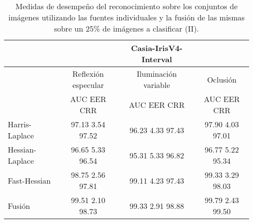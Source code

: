 \begin{table}[h]
\begin{center}
\begin{tabular}{@{}lccc@{}}
\toprule
&& Casia-IrisV4-Interval & \\ \hline
&Reflexión especular		&  	Iluminación variable		& Oclusión \\ \hline
&AUC  \phantom{aa} EER  \phantom{aa} CRR &  	AUC  \phantom{aa} EER  \phantom{aa} CRR		& AUC  \phantom{aa} EER  \phantom{aa} CRR \\ \hline
Harris-Laplace& 97.13 \phantom{aa} 3.54  \phantom{aa} 97.52 &  	96.23 \phantom{aa} 4.33  \phantom{aa}97.43		& 97.90 \phantom{aa} 4.03 \phantom{aa} 97.01 \\
Hessian-Laplace& 96.65 \phantom{aa} 5.33  \phantom{aa} 96.54 &  	95.31 \phantom{aa} 5.33 \phantom{aa} 96.82 & 96.77 \phantom{aa} 5.22 \phantom{aa} 95.34\\
Fast-Hessian& 98.75  \phantom{aa}2.56 \phantom{aa}  97.81 &  	99.11 \phantom{aa} 4.23 \phantom{aa}97.43		& 99.33  \phantom{aa}3.29 \phantom{aa} 98.03 \\
Fusión& 99.51 \phantom{aa} 2.10  \phantom{aa}98.73 &  	99.33  \phantom{aa}2.91 \phantom{aa} 98.88		& 99.79 \phantom{aa} 2.43  \phantom{aa}99.50 \\ \hline

\end{tabular}
\end{center}
\caption{Medidas de desempeño del reconocimiento sobre los conjuntos de imágenes utilizando las fuentes individuales y la fusión de las mismas sobre un 25\% de imágenes a clasificar (II).}
\label{my_tabla}
\end{table}

